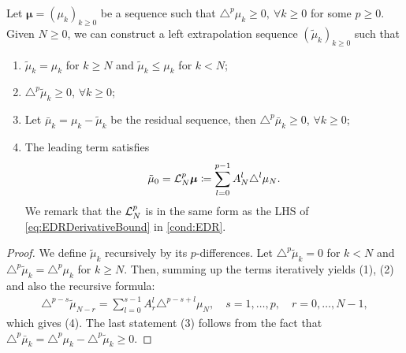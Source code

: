 \begin{lemma}
  \label{lem:LeftExtrapolation}
  Let $\bm{\mu} = (\mu_k)_{k \geq 0}$ be a sequence such that $\triangle^p \mu_k \geq 0,~\forall k \geq 0$ for some $p\geq 0$.
  Given $N \geq 0$, we can construct a left extrapolation sequence $(\tilde{\mu}_k)_{k \geq 0}$ such that
  \begin{enumerate}[(1)]
    \item $\tilde{\mu}_k = \mu_k$ for $k \geq N$ and $\tilde{\mu}_k \leq \mu_k$ for $k < N$;
    \item $\triangle^p \tilde{\mu}_k \geq 0$, $\forall k \geq 0$;
    \item Let $\bar{\mu}_k = \mu_k - \tilde{\mu}_k$ be the residual sequence, then $\triangle^p \bar{\mu}_k \geq 0$, $\forall k \geq 0$;
    \item The leading term satisfies
    \begin{align*}
      \tilde{\mu}_0 = \mathcal{L}_N^p \bm{\mu} \coloneqq \sum_{l=0}^{p-1} A_N^l \triangle^l \mu_N.
    \end{align*}
    We remark that the $\mathcal{L}_N^p$ is in the same form as the LHS of \cref{eq:EDRDerivativeBound} in \cref{cond:EDR}.
  \end{enumerate}
\end{lemma}
\begin{proof}
  We define $\tilde{\mu}_k$ recursively by its $p$-differences.
  Let $\triangle^p \tilde{\mu}_k = 0$ for $k < N$ and $\triangle^p \tilde{\mu}_k = \triangle^p \mu_k$ for $k \geq N$.
  Then, summing up the terms iteratively yields (1), (2) and also the recursive formula:
  \begin{align*}
    \triangle^{p-s}\tilde{\mu}_{N-r} = \sum_{l=0}^{s-1} A^l_r \triangle^{p-s+l} \mu_{N},\quad s = 1,\dots,p,\quad r = 0,\dots,N-1,
  \end{align*}
  which gives (4).
  The last statement (3) follows from the fact that $\triangle^p \bar{\mu}_k = \triangle^p \mu_k - \triangle^p \tilde{\mu}_k \geq 0$.
\end{proof}

